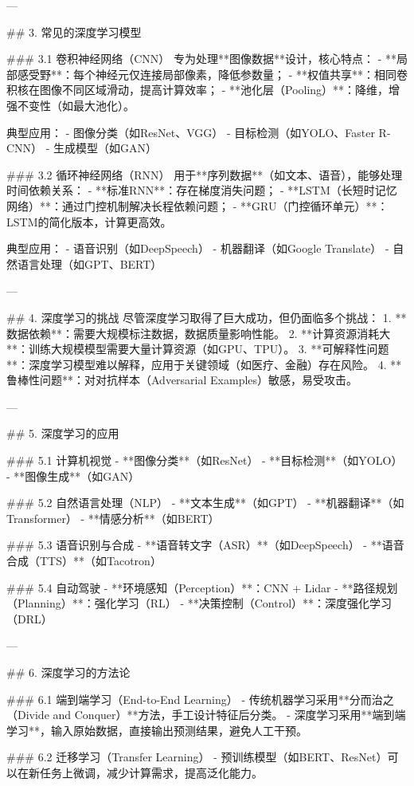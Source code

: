 ---

## 3. 常见的深度学习模型

### 3.1 卷积神经网络（CNN）
专为处理**图像数据**设计，核心特点：
- **局部感受野**：每个神经元仅连接局部像素，降低参数量；
- **权值共享**：相同卷积核在图像不同区域滑动，提高计算效率；
- **池化层（Pooling）**：降维，增强不变性（如最大池化）。

典型应用：
- 图像分类（如ResNet、VGG）
- 目标检测（如YOLO、Faster R-CNN）
- 生成模型（如GAN）

### 3.2 循环神经网络（RNN）
用于**序列数据**（如文本、语音），能够处理时间依赖关系：
- **标准RNN**：存在梯度消失问题；
- **LSTM（长短时记忆网络）**：通过门控机制解决长程依赖问题；
- **GRU（门控循环单元）**：LSTM的简化版本，计算更高效。

典型应用：
- 语音识别（如DeepSpeech）
- 机器翻译（如Google Translate）
- 自然语言处理（如GPT、BERT）

---

## 4. 深度学习的挑战
尽管深度学习取得了巨大成功，但仍面临多个挑战：
1. **数据依赖**：需要大规模标注数据，数据质量影响性能。
2. **计算资源消耗大**：训练大规模模型需要大量计算资源（如GPU、TPU）。
3. **可解释性问题**：深度学习模型难以解释，应用于关键领域（如医疗、金融）存在风险。
4. **鲁棒性问题**：对对抗样本（Adversarial Examples）敏感，易受攻击。

---

## 5. 深度学习的应用

### 5.1 计算机视觉
- **图像分类**（如ResNet）
- **目标检测**（如YOLO）
- **图像生成**（如GAN）

### 5.2 自然语言处理（NLP）
- **文本生成**（如GPT）
- **机器翻译**（如Transformer）
- **情感分析**（如BERT）

### 5.3 语音识别与合成
- **语音转文字（ASR）**（如DeepSpeech）
- **语音合成（TTS）**（如Tacotron）

### 5.4 自动驾驶
- **环境感知（Perception）**：CNN + Lidar
- **路径规划（Planning）**：强化学习（RL）
- **决策控制（Control）**：深度强化学习（DRL）

---

## 6. 深度学习的方法论

### 6.1 端到端学习（End-to-End Learning）
- 传统机器学习采用**分而治之（Divide and Conquer）**方法，手工设计特征后分类。
- 深度学习采用**端到端学习**，输入原始数据，直接输出预测结果，避免人工干预。

### 6.2 迁移学习（Transfer Learning）
- 预训练模型（如BERT、ResNet）可以在新任务上微调，减少计算需求，提高泛化能力。

